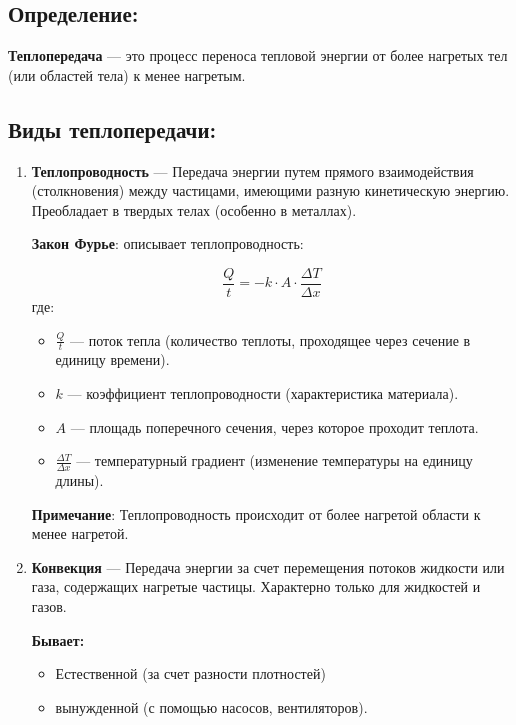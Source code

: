 \documentclass[a4paper,12pt]{article}
\begin{document}
\subsection*{Определение:}
\vspace{-3pt}
\textbf{Теплопередача} — это процесс переноса тепловой энергии от более нагретых тел (или областей тела) к менее нагретым.

\vspace{-9pt}
\subsection*{Виды теплопередачи:}
\vspace{-3pt}
\begin{enumerate}[itemsep=0pt, topsep=0pt, parsep=3pt]
    \item \textbf{Теплопроводность} --- Передача энергии путем прямого взаимодействия (столкновения) между частицами, имеющими разную кинетическую энергию. Преобладает в твердых телах (особенно в металлах).
    \par
    \textbf{Закон Фурье}: описывает теплопроводность:
    \par
    $$ \frac{Q}{t} = -k \cdot A \cdot \frac{\Delta T}{\Delta x} $$
    где:
    \begin{itemize} 
        \item $\frac{Q}{t}$ — поток тепла (количество теплоты, проходящее через сечение в единицу времени).
        \item $k$ — коэффициент теплопроводности (характеристика материала).
        \item $A$ — площадь поперечного сечения, через которое проходит теплота.
        \item $\frac{\Delta T}{\Delta x}$ — температурный градиент (изменение температуры на единицу длины).
    \end{itemize}
    \vspace{-0.05em} %
    \textbf{Примечание}: Теплопроводность происходит от более нагретой области к менее нагретой.

    \item \textbf{Конвекция} --- Передача энергии за счет перемещения потоков жидкости или газа, содержащих нагретые частицы. Характерно только для жидкостей и газов.
    \par
    \textbf{Бывает:}
    \vspace{-0.05 em}
    \begin{itemize}
        \item Естественной (за счет разности плотностей)
        \item вынужденной (с помощью насосов, вентиляторов).
    \end{itemize}
\newpage


\end{enumerate}
\end{document}
